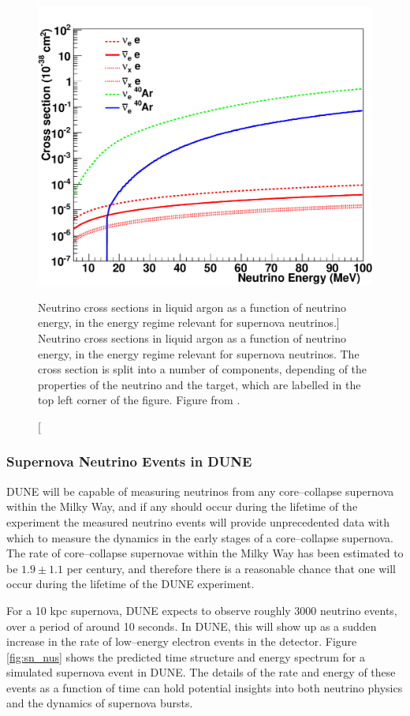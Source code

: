 \begin{figure}
	\centering
	\includegraphics[width=\textwidth]{figures/sn_xsec.pdf}
	\caption
	[Neutrino cross sections in liquid argon as a function of neutrino energy, in
	the energy regime relevant for supernova neutrinos.]
	{Neutrino cross sections in liquid argon as a function of neutrino energy, in 
	the energy regime relevant for supernova neutrinos. The cross
	section is split into a number of components, depending of the properties of
	the neutrino and the target, which are labelled in the top left corner of the 
	figure. Figure from \cite{Abi:2020evt}.}
	\label{fig:sn_xsec}
\end{figure}

\subsubsection{Supernova Neutrino Events in DUNE}

DUNE will be capable of measuring neutrinos from any core--collapse supernova
within the Milky Way, and if any should occur during the lifetime of the
experiment the measured neutrino events will provide unprecedented data with
which to measure the dynamics in the early stages of a core--collapse supernova.
The rate of core--collapse supernovae within the Milky Way has been estimated to
be $1.9 \pm 1.1$ per century\cite{Diehl:2006cf}, and therefore there is a
reasonable chance that one will occur during the lifetime of the DUNE
experiment.

For a 10 kpc supernova, DUNE expects to observe roughly 3000 neutrino events,
over a period of around 10 seconds. In DUNE, this will show up as a sudden
increase in the rate of low--energy electron events in the detector. Figure 
\ref{fig:sn_nus} shows the predicted time structure and energy spectrum for a 
simulated supernova event in DUNE\cite{Abi:2020evt}. The details of the rate 
and energy of these events as a function of time can hold potential insights 
into both neutrino physics and the dynamics of supernova bursts. 

